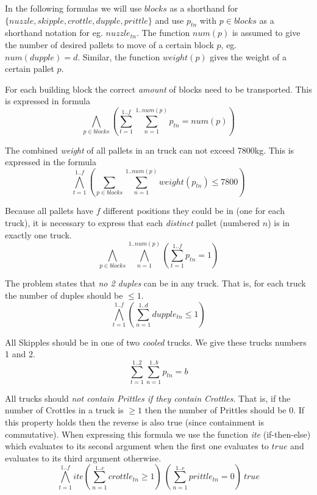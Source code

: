 \documentclass[12pt]{article}
\begin{document}
\vspace{3mm}

In the following formulas we will use $blocks$ as a shorthand for $\{nuzzle, 
skipple, crottle, dupple, prittle\}$ and use $p_{tn}$ with $p \in blocks$
as a shorthand notation for eg. $nuzzle_{tn}$. The function $num(p)$ is assumed 
to give the number of desired pallets to move of a certain block $p$, eg.
$num(dupple) = d$. Similar, the function $weight(p)$ gives the weight of a 
certain pallet $p$.

\vspace{3mm}

For each building block the correct \emph{amount} of blocks need to be
transported. This is expressed in formula
\begin{equation} \label{eq:amount}
  \bigwedge_{p \in blocks} 
  	(\sum_{t=1}^{1..f} \sum_{n=1}^{1..num(p)} p_{tn} = num(p))
\end{equation}

The combined \emph{weight} of all pallets in an truck can not exceed 7800kg. 
This is expressed in the formula
\begin{equation} \label{eq:weight}
 \bigwedge_{t=1}^{1..f} 
 	(\sum_{p \in blocks}  \sum_{n=1}^{1..num(p)} weight(p_{tn}) \leq 7800)
\end{equation}

Because all pallets have $f$ different positions they could be in (one for each
truck), it is necessary to express that each \emph{distinct} pallet (numbered 
$n$) is in exactly one truck.
\begin{equation} \label{eq:distinct}
  \bigwedge_{p \in blocks}  
  	\bigwedge_{n=1}^{1..num(p)} (\sum_{t=1}^{1..f} p_{tn} = 1)
\end{equation}

The problem states that \emph{no 2 duples} can be in any truck. 
That is, for each truck the number of duples should be $\leq 1$. 
\begin{equation} \label{eq:valuable}
  \bigwedge_{t=1}^{1..f} (\sum_{n=1}^{1..d} dupple_{tn} \leq 1)
\end{equation}

All Skipples should be in one of two \emph{cooled} trucks. We give these trucks
numbers 1 and 2. 
\begin{equation} \label{eq:cooled}
  \sum_{t=1}^{1..2} \sum_{n=1}^{1..b} p_{tn} = b
\end{equation}

All trucks should \emph{not contain Prittles if they contain Crottles}. That is,
if the number of Crottles in a truck is $\geq 1$ then the number of Prittles 
should be 0. If this
property holds then the reverse is also true (since containment is commutative).
When expressing this formula we use the function \emph{ite} (if-then-else) which
evaluates to its second argument when the first one evaluates to $true$ and 
evaluates to its third argument otherwise.
\begin{equation} \label{eq:explosive}
  \bigwedge_{t=1}^{1..f} ite 	(\sum_{n=1}^{1..c} crottle_{tn} \geq 1)\  
								(\sum_{n=1}^{1..e} prittle_{tn} = 0)\ 
								true 
\end{equation}
\end{document}
